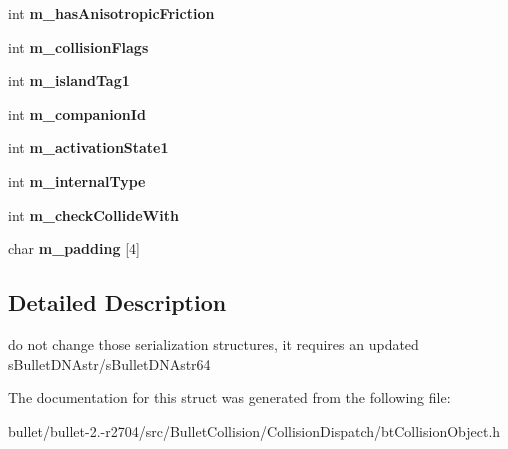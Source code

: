 \begin{DoxyCompactItemize}
\item 
\hypertarget{structbt_collision_object_double_data_a484f030fe1fab07659bdf0f89b3cd96b}{int {\bfseries m\+\_\+has\+Anisotropic\+Friction}}\label{structbt_collision_object_double_data_a484f030fe1fab07659bdf0f89b3cd96b}

\item 
\hypertarget{structbt_collision_object_double_data_a6f954bbcd5e806e7c51dfcf4314f5b39}{int {\bfseries m\+\_\+collision\+Flags}}\label{structbt_collision_object_double_data_a6f954bbcd5e806e7c51dfcf4314f5b39}

\item 
\hypertarget{structbt_collision_object_double_data_ad6d5d8c47f6876ef2f2b3c1de0bd3280}{int {\bfseries m\+\_\+island\+Tag1}}\label{structbt_collision_object_double_data_ad6d5d8c47f6876ef2f2b3c1de0bd3280}

\item 
\hypertarget{structbt_collision_object_double_data_ae0356e860626b042242c51568eb3f5f7}{int {\bfseries m\+\_\+companion\+Id}}\label{structbt_collision_object_double_data_ae0356e860626b042242c51568eb3f5f7}

\item 
\hypertarget{structbt_collision_object_double_data_ac8a7e24234fde349624f52885d13cf98}{int {\bfseries m\+\_\+activation\+State1}}\label{structbt_collision_object_double_data_ac8a7e24234fde349624f52885d13cf98}

\item 
\hypertarget{structbt_collision_object_double_data_a1647e762dc61c0147862b4fbf42221c5}{int {\bfseries m\+\_\+internal\+Type}}\label{structbt_collision_object_double_data_a1647e762dc61c0147862b4fbf42221c5}

\item 
\hypertarget{structbt_collision_object_double_data_abb1b716569e08c0e8c769518c833d30e}{int {\bfseries m\+\_\+check\+Collide\+With}}\label{structbt_collision_object_double_data_abb1b716569e08c0e8c769518c833d30e}

\item 
\hypertarget{structbt_collision_object_double_data_a8f7e457fc27277d4e5060de0febcb35b}{char {\bfseries m\+\_\+padding} \mbox{[}4\mbox{]}}\label{structbt_collision_object_double_data_a8f7e457fc27277d4e5060de0febcb35b}

\end{DoxyCompactItemize}


\subsection{Detailed Description}
do not change those serialization structures, it requires an updated s\+Bullet\+D\+N\+Astr/s\+Bullet\+D\+N\+Astr64 

The documentation for this struct was generated from the following file\+:\begin{DoxyCompactItemize}
\item 
bullet/bullet-\/2.-\/r2704/src/\+Bullet\+Collision/\+Collision\+Dispatch/bt\+Collision\+Object.\+h\end{DoxyCompactItemize}
